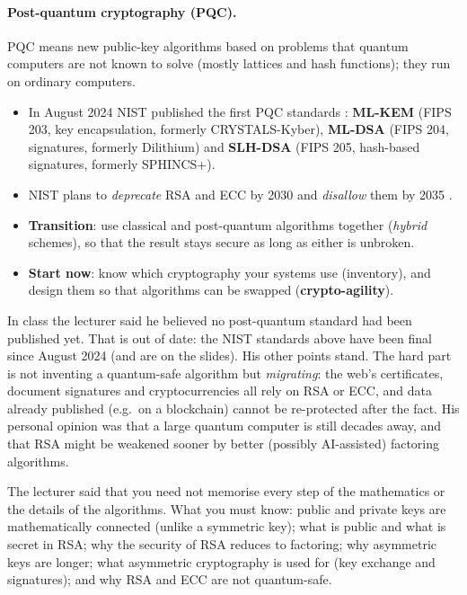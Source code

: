 \paragraph{Post-quantum cryptography (PQC).} PQC means new public-key algorithms based on problems that quantum computers are not known to solve (mostly lattices and hash functions); they run on ordinary computers.
\begin{itemize}
    \item In August 2024 NIST published the first PQC standards \cite{fips203}: \textbf{ML-KEM} (FIPS 203, key encapsulation, formerly CRYSTALS-Kyber), \textbf{ML-DSA} (FIPS 204, signatures, formerly Dilithium) and \textbf{SLH-DSA} (FIPS 205, hash-based signatures, formerly SPHINCS+).
    \item NIST plans to \emph{deprecate} RSA and ECC by 2030 and \emph{disallow} them by 2035 \cite{nistir8547}.
    \item \textbf{Transition}: use classical and post-quantum algorithms together (\emph{hybrid} schemes), so that the result stays secure as long as either is unbroken.
    \item \textbf{Start now}: know which cryptography your systems use (inventory), and design them so that algorithms can be swapped (\textbf{crypto-agility}).
\end{itemize}

\begin{remark}
In class the lecturer said he believed no post-quantum standard had been published yet. That is out of date: the NIST standards above have been final since August 2024 (and are on the slides). His other points stand. The hard part is not inventing a quantum-safe algorithm but \emph{migrating}: the web's certificates, document signatures and cryptocurrencies all rely on RSA or ECC, and data already published (e.g.\ on a blockchain) cannot be re-protected after the fact. His personal opinion was that a large quantum computer is still decades away, and that RSA might be weakened sooner by better (possibly AI-assisted) factoring algorithms.
\end{remark}

\begin{remark}
The lecturer said that you need not memorise every step of the mathematics or the details of the algorithms. What you must know: public and private keys are mathematically connected (unlike a symmetric key); what is public and what is secret in RSA; why the security of RSA reduces to factoring; why asymmetric keys are longer; what asymmetric cryptography is used for (key exchange and signatures); and why RSA and ECC are not quantum-safe.
\end{remark}

